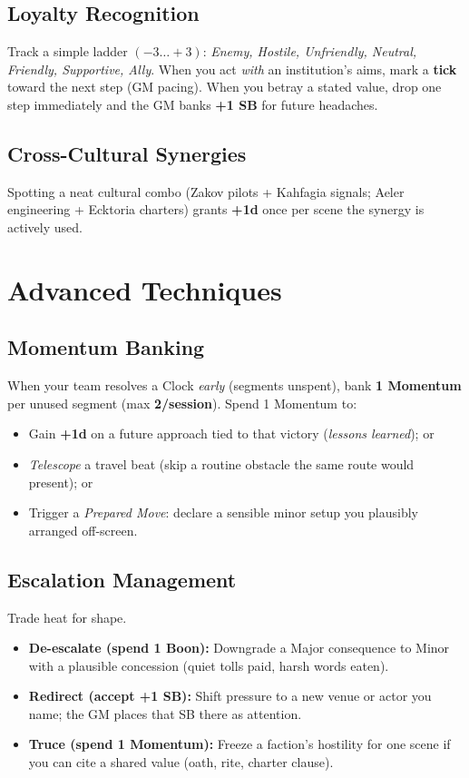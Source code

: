 \begin{multicols}{2}
\subsection{Loyalty Recognition}
Track a simple ladder \((-3\ldots+3)\): \emph{Enemy, Hostile, Unfriendly, Neutral, Friendly, Supportive, Ally}. When you act \emph{with} an institution’s aims, mark a \textbf{tick} toward the next step (GM pacing). When you betray a stated value, drop one step immediately and the GM banks \textbf{+1 SB} for future headaches.

\subsection{Cross-Cultural Synergies}
Spotting a neat cultural combo (Zakov pilots + Kahfagia signals; Aeler engineering + Ecktoria charters) grants \textbf{+1d} once per scene the synergy is actively used.

\section{Advanced Techniques}

\subsection{Momentum Banking}\label{sec:momentum-banking}
When your team resolves a Clock \emph{early} (segments unspent), bank \textbf{1 Momentum} per unused segment (max \textbf{2/session}). Spend 1 Momentum to:
\begin{itemize}
  \item Gain \textbf{+1d} on a future approach tied to that victory (\emph{lessons learned}); or
  \item \emph{Telescope} a travel beat (skip a routine obstacle the same route would present); or
  \item Trigger a \emph{Prepared Move}: declare a sensible minor setup you plausibly arranged off-screen.
\end{itemize}

\subsection{Escalation Management}
Trade heat for shape.
\begin{itemize}
  \item \textbf{De-escalate (spend 1 Boon):} Downgrade a Major consequence to Minor with a plausible concession (quiet tolls paid, harsh words eaten).
  \item \textbf{Redirect (accept +1 SB):} Shift pressure to a new venue or actor you name; the GM places that SB there as attention.
  \item \textbf{Truce (spend 1 Momentum):} Freeze a faction’s hostility for one scene if you can cite a shared value (oath, rite, charter clause).%
\end{itemize}


\end{multicols}
